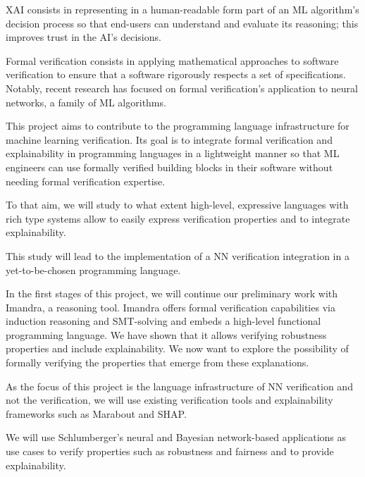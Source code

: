 \documentclass[]{article}
\begin{document}
XAI consists in representing in a human-readable form part of an ML algorithm’s decision process so that end-users can understand and evaluate its reasoning; this improves trust in the AI’s decisions.

Formal verification consists in applying mathematical approaches to software verification to ensure that a software rigorously respects a set of specifications. Notably, recent research has focused on formal verification’s application to neural networks, a family of ML algorithms.

This project aims to contribute to the programming language infrastructure for machine learning verification. Its goal is to integrate formal verification and explainability in programming languages in a lightweight manner so that ML engineers can use formally verified building blocks in their software without needing formal verification expertise.

To that aim, we will study to what extent high-level, expressive languages with rich type systems allow to easily express verification properties and to integrate explainability.

This study will lead to the implementation of a NN verification integration in a yet-to-be-chosen programming language.

In the first stages of this project, we will continue our preliminary work with Imandra, a reasoning tool. Imandra offers formal verification capabilities via induction reasoning and SMT-solving and embeds a high-level functional programming language. We have shown that it allows verifying robustness properties and include explainability. We now want to explore the possibility of formally verifying the properties that emerge from these explanations.

As the focus of this project is the language infrastructure of NN verification and not the verification, we will use existing verification tools and explainability frameworks such as Marabout and SHAP.

We will use Schlumberger’s neural and Bayesian network-based applications as use cases to verify properties such as robustness and fairness and to provide explainability.
\fi
\end{document}

